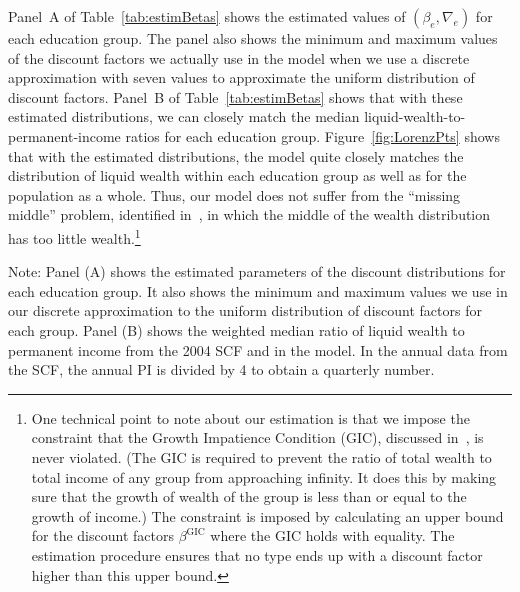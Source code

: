 \documentclass[qe,draft]{econsocart}
\theoremstyle{plain}
\theoremstyle{definition}
\begin{document}
Panel~A of Table~\ref{tab:estimBetas} shows the estimated values of $(\beta_e, \nabla_e)$ for each education group.
The panel also shows the minimum and maximum values of the discount factors we actually use in the model when we use a discrete approximation with seven values to approximate the uniform distribution of discount factors.
Panel~B of Table~\ref{tab:estimBetas} shows that with these estimated distributions, we can closely match the median liquid-wealth-to-permanent-income ratios for each education group.
Figure~\ref{fig:LorenzPts} shows that with the estimated distributions, the model quite closely matches the distribution of liquid wealth within each education group as well as for the population as a whole.
Thus, our model does not suffer from the ``missing middle'' problem, identified in~\cite{kaplanMPC2022}, in which the middle of the wealth distribution has too little wealth.\footnote{One technical point to note about our estimation is that we impose the constraint that the Growth Impatience Condition (GIC), discussed in~\cite{carroll2022theoretical}, is never violated. (The GIC is required to prevent the ratio of total wealth to total income of any group from approaching infinity. It does this by making sure that the growth of wealth of the group is less than or equal to the growth of income.) The constraint is imposed by calculating an upper bound for the discount factors $\beta^{\text{GIC}}$ where the GIC holds with equality. The estimation procedure ensures that no type ends up with a discount factor higher than this upper bound.}

\begin{table}[tb] 
  \caption{\pregenmark Estimated discount factor distributions and estimation targets}
  \label{tab:estimBetas} %
  \centering


  \noindent\parbox{\textwidth}{
    \medskip
    \footnotesize Note: Panel (A) shows the estimated parameters of the discount distributions for each education group. It also shows the minimum and maximum values we use in our discrete approximation to the uniform distribution of discount factors for each group. Panel (B) shows the weighted median ratio of liquid wealth to permanent income from the 2004 SCF and in the model. In the annual data from the SCF, the annual PI is divided by 4 to obtain a quarterly number.
  }

\end{table}
\end{document}
